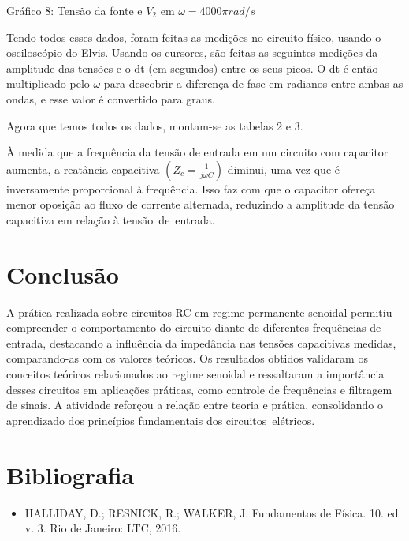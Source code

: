 \documentclass[a4 paper]{article}
\newcommand{\parag}{\hspace{30pt}}
\begin{document}
\begin{center}
Gráfico 8: Tensão da fonte e $V_2$ em $\omega =4000\pi rad/s $
\end{center}

\newpage
Tendo todos esses dados, foram feitas as medições no circuito físico, usando o osciloscópio do Elvis. Usando os cursores, são feitas as seguintes medições da amplitude das tensões e o dt (em segundos) entre os seus picos. O dt é então multiplicado pelo $\omega$ para descobrir a diferença de fase em radianos entre ambas as ondas, e esse valor é convertido para graus. 



\newpage
Agora que temos todos os dados, montam-se as tabelas 2 e 3.





À medida que a frequência da tensão de entrada em um circuito com capacitor aumenta, a reatância capacitiva $(Z_c = \frac{1}{j\omega C})$ diminui, uma vez que é inversamente proporcional à frequência. Isso faz com que o capacitor ofereça menor oposição ao fluxo de corrente alternada, reduzindo a amplitude da tensão capacitiva em relação à tensão de entrada.



\newpage
\section{Conclusão}

\parag A prática realizada sobre circuitos RC em regime permanente senoidal permitiu compreender o comportamento do circuito diante de diferentes frequências de entrada, destacando a influência da impedância nas tensões capacitivas medidas, comparando-as com os valores teóricos. Os resultados obtidos validaram os conceitos teóricos relacionados ao regime senoidal e ressaltaram a importância desses circuitos em aplicações práticas, como controle de frequências e filtragem de sinais. A atividade reforçou a relação entre teoria e prática, consolidando o aprendizado dos princípios fundamentais dos circuitos elétricos.

\section{Bibliografia}

\begin{itemize}
\item HALLIDAY, D.; RESNICK, R.; WALKER, J. Fundamentos de Física. 10. ed. v. 3. Rio de Janeiro: LTC, 2016.
\end{itemize}
\end{document}
